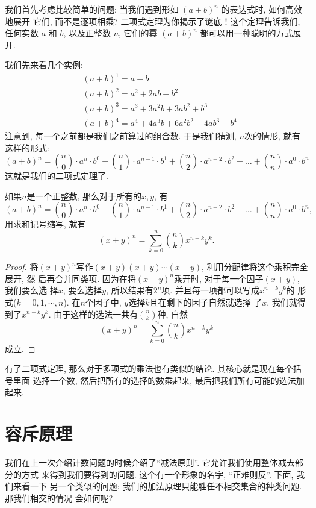 我们首先考虑比较简单的问题: 当我们遇到形如 $(a + b)^n$ 的表达式时, 如何高效地展开
它们, 而不是逐项相乘? 二项式定理为你揭示了谜底！这个定理告诉我们, 任何实数 $a$ 和 
$b$, 以及正整数 $n$, 它们的幂 $(a + b)^n$ 都可以用一种聪明的方式展开. 

我们先来看几个实例: 
\begin{align*}
&(a + b)^1 = a + b \\
&(a + b)^2 = a^2 + 2ab + b^2 \\
&(a + b)^3 = a^3 + 3a^2b + 3ab^2 + b^3 \\
&(a + b)^4 = a^4 + 4a^3b + 6a^2b^2 + 4ab^3 + b^4
\end{align*}
注意到, 每一个之前都是我们之前算过的组合数. 于是我们猜测, $n$次的情形, 就有
这样的形式: 
\[
(a + b)^n = \binom{n}{0} \cdot a^n \cdot b^0 + \binom{n}{1} \cdot a^{n-1} \cdot b^1 + \binom{n}{2} \cdot a^{n-2} \cdot b^2 + \ldots + \binom{n}{n} \cdot a^0 \cdot b^n
\]
这就是我们的二项式定理了. 

\begin{theorem}[二项式定理]
    如果$n$是一个正整数, 那么对于所有的$x,y$, 有
    \[
    (a + b)^n = \binom{n}{0} \cdot a^n \cdot b^0 + \binom{n}{1} \cdot a^{n-1} \cdot b^1 + \binom{n}{2} \cdot a^{n-2} \cdot b^2 + \ldots + \binom{n}{n} \cdot a^0 \cdot b^n,
    \]
    用求和记号缩写, 就有
    $$
    (x+y)^n = \sum_{k=0}^n \binom nk x^{n-k}y^k.
    $$
\end{theorem}
\begin{proof}
    将$(x+y)^n$写作$(x+y)(x+y)\cdots(x+y)$, 利用分配律将这个乘积完全展开, 然
    后再合并同类项. 因为在将$(x+y)^n$乘开时, 对于每一个因子$(x+y)$, 我们要么选
    择$x$, 要么选择$y$, 所以结果有$2^n$项. 并且每一项都可以写成$x^{n-k}y^k$的
    形式($k=0,1,\cdots,n$). 在$n$个因子中, $y$选择$k$且在剩下的因子自然就选择
    了$x$, 我们就得到了$x^{n-k}y^k$. 由于这样的选法一共有$\binom nk$种, 自然
    $$
    (x+y)^n=\sum_{k=0}^n\binom nkx^{n-k}y^k
    $$成立. 
\end{proof}

有了二项式定理, 那么对于多项式的乘法也有类似的结论. 其核心就是现在每个括号里面
选择一个数, 然后把所有的选择的数乘起来, 最后把我们所有可能的选法加起来.  

\section{容斥原理} 

我们在上一次介绍计数问题的时候介绍了``减法原则''. 它允许我们使用整体减去部分的方式
来得到我们要得到的问题. 这个有一个形象的名字, ``正难则反''. 下面, 我们来看一下 
另一个类似的问题: 我们的加法原理只能胜任不相交集合的种类问题. 那我们相交的情况
会如何呢? 


